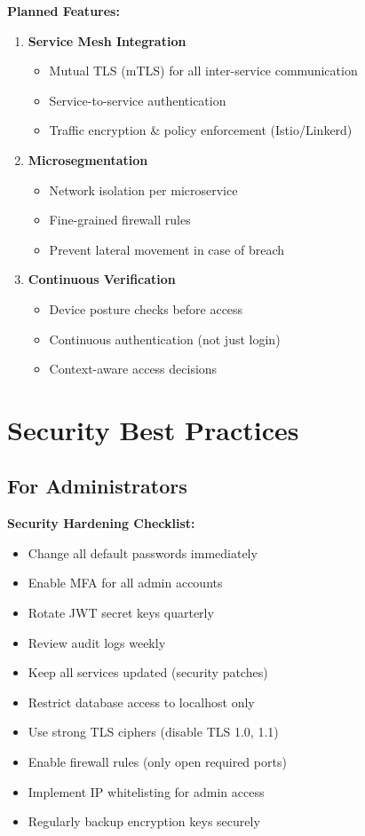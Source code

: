 \textbf{Planned Features:}
\begin{enumerate}
    \item \textbf{Service Mesh Integration}
    \begin{itemize}
        \item Mutual TLS (mTLS) for all inter-service communication
        \item Service-to-service authentication
        \item Traffic encryption \& policy enforcement (Istio/Linkerd)
    \end{itemize}
    
    \item \textbf{Microsegmentation}
    \begin{itemize}
        \item Network isolation per microservice
        \item Fine-grained firewall rules
        \item Prevent lateral movement in case of breach
    \end{itemize}
    
    \item \textbf{Continuous Verification}
    \begin{itemize}
        \item Device posture checks before access
        \item Continuous authentication (not just login)
        \item Context-aware access decisions
    \end{itemize}
\end{enumerate}

\section{Security Best Practices}

\subsection{For Administrators}

\begin{infobox}
\textbf{Security Hardening Checklist:}
\begin{itemize}[noitemsep]
    \item Change all default passwords immediately
    \item Enable MFA for all admin accounts
    \item Rotate JWT secret keys quarterly
    \item Review audit logs weekly
    \item Keep all services updated (security patches)
    \item Restrict database access to localhost only
    \item Use strong TLS ciphers (disable TLS 1.0, 1.1)
    \item Enable firewall rules (only open required ports)
    \item Implement IP whitelisting for admin access
    \item Regularly backup encryption keys securely
\end{itemize}
\end{infobox}

